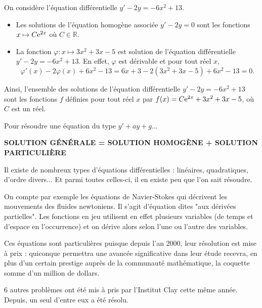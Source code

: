 \documentclass[11pt,fleqn, openany]{book} %
\begin{document}
\begin{example} On considère l'équation différentielle $y'-2y=-6x^2+13$.
\begin{itemize}
\item Les solutions de l'équation homogène associée $y'-2y=0$ sont les fonctions $x\mapsto C\mathrm{e}^{2x}$ où $C\in\mathbb{R}$.
\item La fonction $\varphi:x\mapsto 3x^2+3x-5$ est solution de l'équation différentielle $y'-2y=-6x^2+13$. En effet, $\varphi$ est dérivable et pour tout réel $x$, 
\[\varphi'(x)-2\varphi(x)+6x^2-13=6x+3-2(3x^2+3x-5)+6x^2-13=0.\]
\end{itemize}
Ainsi, l'ensemble des solutions de l'équation différentielle $y'-2y=-6x^2+13$ sont les fonctions $f$ définies pour tout réel $x$ par $f(x)=C\mathrm{e}^{2x}+3x^2+3x-5$, où $C$ est un réel.\end{example}

\begin{proposition} Pour résoudre une équation du type $y'+ay+g$...
\begin{center}
\textbf{SOLUTION GÉNÉRALE = SOLUTION HOMOGÈNE + SOLUTION PARTICULIÈRE}
\end{center}\vspace{-0.5cm}\end{proposition}


Il existe de nombreux types d'équations différentielles : linéaires, quadratiques, d'ordre divers... Et parmi toutes celles-ci, il en existe peu que l'on sait résoudre.

On compte par exemple les équations de Navier-Stokes qui décrivent les mouvements des fluides newtoniens. Il s'agit d'équation dites "aux dérivées partielles". Les fonctions en jeu utilisent en effet plusieurs variables (de temps et d'espace en l'occurrence) et on dérive alors selon l'une ou l'autre des variables.

Ces équations sont particulières puisque depuis l'an 2000, leur résolution est mise à prix : quiconque permettra une avancée significative dans leur étude recevra, en plus d'un certain prestige auprès de la communauté mathématique, la coquette somme d'un million de dollars. 

6 autres problèmes ont été mis à pris par l'Institut Clay cette même année. Depuis, un seul d'entre eux a été résolu.
\end{document}
